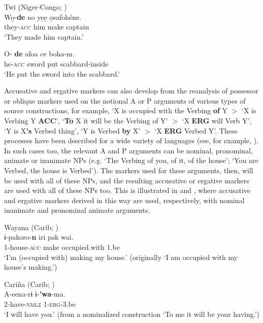 \documentclass[output=paper]{langsci/langscibook}
\begin{document}
\ea\label{twi}
Twi (Niger-Congo; )\\
\ea
\gll Wo̱-\textbf{{de}} no ye̱e̱ o̱safohéne.\\
they-\textsc{acc} him make captain\\
\glt `They made him captain.' 

\ex
\gll O-\textbf{{ de}} afoa ce boha-m.\\
he-\textsc{acc} sword put scabbard-inside\\
\glt `He put the sword into the scabbard.' 

\z
\z



Accusative and ergative markers  can  also develop from the
  reanalysis of possessor or oblique markers used on the notional A or
  P arguments of various types of source constructions, for example,
  `X is occupied with the Verbing  {\bf of} Y $>$ `X
        is Verbing Y {\bf ACC}', `{\bf To} X it will be the Verbing
        of Y' $>$ `X {\bf ERG} 
        will Verb Y',  `Y is X{\bf 's} Verbed thing', `Y is
        Verbed {\bf by} X'
        $>$ `X {\bf ERG} Verbed Y'. These processes have been described for
        a wide variety of languages (see, for example,
     \citealt{HarrisCampbell1995,Bubenik1998,Gildea1998,Creissels2008}). In such cases
        too,  the relevant A and P arguments can be nominal,
        pronominal, animate or inanimate NPs (e.g. `The Verbing of
        you, of it, of the house'; `You are Verbed, the house is
        Verbed'). The  markers used for these arguments, then,  will
        be used with all of these NPs, and the resulting accusative or
        ergative markers are used with all of these NPs too. This is
        illustrated in  and , where accusative and
        ergative markers derived in this way are used, respectively,
        with nominal inanimate and pronominal animate arguments.

\newpage

\ea\label{wayana}
Wayana (Carib;  )\\
\gll ​ɨ-pakoro-\textbf{{n}} iri pək wai.\\
1-house-\textsc{acc} make occupied.with 1.be\\
\glt `I'm (occupied with) making my house.' (originally `I am occupied with my house's making.')

\z

\ea\label{carina}
Cari\~na (Carib;  )\\
\gll A-eena-r​ɨ ​ɨ-\textbf{{'wa}}-ma.\\
2-have-\textsc{nmlz} 1-\textsc{erg}-3.be\\
\glt `I will have you.' (from a nominalized construction `To me it will be your having.')
\end{document}
